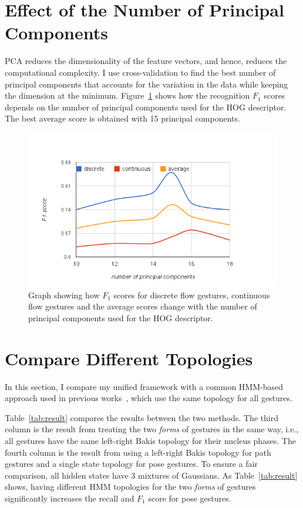 \section{Effect of the Number of Principal Components}
PCA reduces the dimensionality of the feature vectors, and hence, reduces the
computational complexity. I use cross-validation to find the
best number of principal components that accounts for the
variation in the data while keeping the dimension at the
minimum. Figure~\ref{fig:pca} shows how the recognition $F_1$ scores depends on
the number of principal components used for the HOG descriptor.
The best average score is obtained with 15 principal components.

\begin{figure}[tbh]
\centering
\includegraphics[width=\columnwidth]{figures/f1_pca.png}
\caption{Graph showing how $F_1$ scores for discrete flow gestures, continuous
flow gestures and the average scores change with the number of principal
components used for the HOG descriptor.}
\label{fig:pca}
\end{figure}

\section{Compare Different Topologies}
In this section, I compare my unified framework with a common HMM-based approach
used in previous works~\cite{sharma00, Starner95}, which use the same
topology for all gestures.

Table~\ref{tab:result} compares the results between the two methods.
The third column is the result from treating the two \textit{forms} of gestures
in the same way, i.e., all gestures have the same left-right Bakis topology for their
nucleus phases. The fourth column is the result from using a left-right Bakis
topology for path gestures and a single state topology for pose gestures. To
ensure a fair comparison, all hidden states have 3 mixtures of Gaussians. As Table~\ref{tab:result}
shows, having different HMM topologies for the two \textit{forms} of gestures
significantly increases the recall and $F_1$ score for pose gestures.

